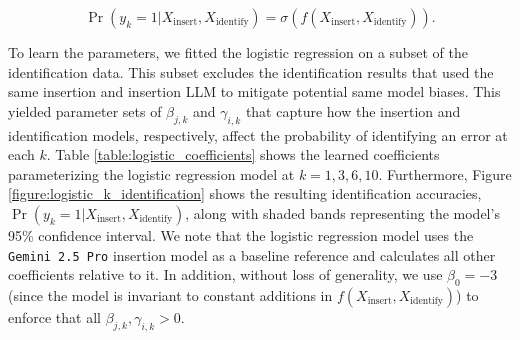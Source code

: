 \documentclass{article}
\newcommand{\gemini}{\texttt{Gemini 2.5 Pro}}
\begin{document}
\begin{equation*}
    \Pr(y_k = 1 |X_{\text{insert}}, X_{\text{identify}})
    =
    \sigma\!\left( f(X_{\text{insert}}, X_{\text{identify}})
    \right).
\end{equation*}

To learn the parameters, we fitted the logistic regression on a subset of the identification data. This subset excludes the identification results that used the same insertion and insertion LLM to mitigate potential same model biases. This yielded parameter sets of $\beta_{j,k}$ and $\gamma_{i,k}$ that capture how the insertion and identification models, respectively, affect the probability of identifying an error at each $k$. Table \ref{table:logistic_coefficients} shows the learned coefficients parameterizing the logistic regression model at $k=1,3,6,10$. Furthermore, Figure \ref{figure:logistic_k_identification} shows the resulting identification accuracies, $\Pr(y_k = 1 |X_{\text{insert}}, X_{\text{identify}})$, along with shaded bands representing the model's 95\% confidence interval. We note that the logistic regression model uses the \gemini{} insertion model as a baseline reference and calculates all other coefficients relative to it. In addition, without loss of generality, we use $\beta_0=-3$ (since the model is invariant to constant additions in $f(X_{\text{insert}}, X_{\text{identify}})$) to enforce that all $\beta_{j,k}, \gamma_{i, k} > 0$.
\end{document}
